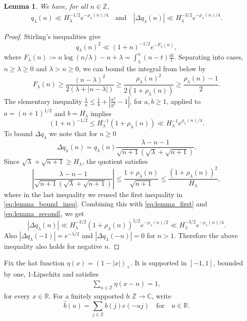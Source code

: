 \documentclass[a4paper,reqno,12pt]{amsart}
\theoremstyle{plain}
\newtheorem{lemma}[theorem]{Lemma}
\theoremstyle{plain}
\theoremstyle{remark}
\theoremstyle{plain}
\newcommand{\z}{\mathbb{Z}}
\newcommand{\RR}{\mathbb{R}}
\newcommand{\cp}{\mathbb{C}} %
\newcommand{\ft}{\widehat}
\newcommand{\la}{\lambda}
\newcommand{\dd}{\mathrm{d}}
\theoremstyle{plain}
\theoremstyle{plain}
\begin{document}
{\begin{lemma}\label{lem:poisson1d}
We have, for all $n \in \mathbb{Z}$,
\begin{align}
q_\lambda(n)\ll H_\lambda^{-1/2}e^{-\rho_\lambda(n)/4} \quad \text{and} \quad
|\Delta q_\lambda(n)|\ll H_\lambda^{-3/2}e^{-\rho_\lambda(n)/4}.
\label{eq:poissonPointwiseBound}
\end{align}
\end{lemma}

\begin{proof}
Stirling's inequalities give
\begin{equation} \label{eq:lemma_first}
q_\lambda(n)^2\ll(1+n)^{-1/2}e^{-F_\lambda(n)},
\end{equation}
where $F_\lambda(n):=n\log(n/\lambda)-n+\lambda= {\int_{\la}^n (n-t)\frac{\dd t}{t}}$. Separating into cases, $n\geq \la \geq 0$ and $\la > n\geq 0$, we can bound the integral from below by
\begin{equation} \label{eq:lemma_second}
F_\lambda(n)\ge\frac{(n-\lambda)^2}{2(\lambda+|n-\lambda|)}
\ge\frac{\rho_\lambda(n)^2}{2(1+\rho_\lambda(n))}\ge\frac{\rho_\lambda(n)-1}{2}.
\end{equation}
The elementary inequality $\frac{1}{a} \leq \frac{1}{b} + |\frac{a^2}{b^2}-1|$, for $a,b\geq 1$, applied to $a=(n+1)^{1/2}$ and $b=H_\lambda$ implies
\begin{equation} \label{eq:lemma_bound_ineq}
(1+n)^{-1/2}\le H_\lambda^{-1}(1+\rho_\lambda(n))
\ll H_\lambda^{-1}e^{\rho_\lambda(n)/4}.
\end{equation}
To bound $\Delta q_{\lambda}$ we note that for $n \geq 0$ 
\[
\Delta q_\lambda(n)
=q_\lambda(n)\frac{\lambda-n-1}
{\sqrt{n+1}(\sqrt\lambda+\sqrt{n+1})}.
\]
Since $\sqrt\lambda+\sqrt{n+1}\ge H_\lambda$, the quotient satisfies
\[
\left|\frac{\lambda-n-1}
{\sqrt{n+1}(\sqrt\lambda+\sqrt{n+1})}\right|
\le\frac{1+\rho_\lambda(n)}{\sqrt{n+1}}
\le\frac{(1+\rho_\lambda(n))^2}{H_\lambda},
\]
where in the last inequality we reused the first inequality in \eqref{eq:lemma_bound_ineq}. Combining this with \eqref{eq:lemma_first} and \eqref{eq:lemma_second}, we get 
$$
| \Delta q_{\lambda}(n) | \ll H_{\lambda}^{-3/2} (1 + \rho_{\lambda}(n))^{5/2} e^{-\rho_{\lambda}(n) / 2} \ll H_{\lambda}^{-3/2} e^{-\rho_{\lambda}(n) / 4}.
$$
Also $|\Delta q_{\lambda}(-1)| = e^{-\lambda / 2}$ and $|\Delta q_{\lambda}(- n)| = 0$ for $n > 1$. Therefore the above inequality also holds for negative $n$.
\end{proof}

Fix the hat function $\eta(x)=(1-|x|)_+$.
It is supported in $[-1,1]$, bounded by one, $1$-Lipschitz and {satisfies}
\begin{align}
\sum_{n\in\z}\eta(x-n)=1,
\label{eq:shiftFreePartitionUnity}
\end{align}
for every $x\in\RR$. For a finitely supported $b:\z\to\cp$, write
\[
\ft b(u)=\sum_{j\in\z}b(j)e(-uj) \quad \text{for} \quad u\in \RR.
\]

}
\end{document}
